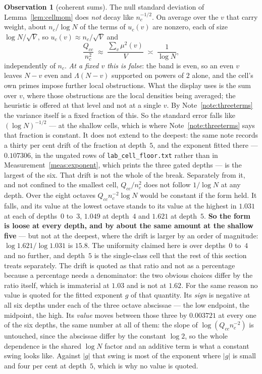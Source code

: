 \documentclass[11pt,a4paper]{article}
\theoremstyle{plain}
\theoremstyle{definition}
\newtheorem{observation}[theorem]{Observation}
\theoremstyle{remark}
\begin{document}
\begin{observation}[coherent sums]\label{obs:coh}
The null standard deviation of Lemma~\ref{lem:cellmom} does \emph{not} decay like
$n_c^{-1/2}$. On average over the $v$ that carry weight, about
$n_c/\log N$ of the terms of $u_c(v)$ are nonzero, each of size
$\log N/\sqrt V$, so $u_c(v)\approx n_c/\sqrt V$ and
\[
  \frac{Q_{cc}}{n_c^2}
  \;\approx\;\frac{\sum_v\mu^2(v)}{V}
  \;\asymp\;\frac{1}{\log N},
\]
independently of $n_c$. \emph{At a fixed $v$ this is false}: the band
is even, so an even $v$ leaves $N-v$ even and $\Lambda(N-v)$ supported
on powers of $2$ alone, and the cell's own primes impose further local
obstructions. What the display uses is the sum over $v$, where those
obstructions are the local densities being averaged; the heuristic is
offered at that level and not at a single $v$. By
Note~\ref{note:threeterms} the variance
itself is a fixed fraction of this. So the standard error falls
like $(\log N)^{-1/2}$ --- at the shallow cells, which is where
Note~\ref{note:threeterms} says that fraction is constant. It
does not extend to the deepest: the same note records a thirty per
cent drift of the fraction at depth~$5$, and the exponent fitted there
--- $0.107306$, in the ungated rows of \texttt{lab\_cell\_floor.txt}
rather than in Measurement~\ref{meas:exponent}, which prints the three
gated depths --- is the largest of the six. That drift is not the
whole of the break. Separately from it, and not confined to the
smallest cell, $Q_{cc}/n_c^2$ does not follow $1\!/\!\log N$ at any
depth. Over the eight octaves
$Q_{cc}n_c^{-2}\log N$ would be constant if the form held. It falls,
and its value at the lowest octave stands to its value at the highest
in $1.031$ at each of depths~$0$ to~$3$, $1.049$ at depth~$4$ and
$1.621$ at depth~$5$. \textbf{So the form is loose at every depth, and
by about the same amount at the shallow five} --- but not at the
deepest, where the drift is larger by an order of magnitude:
$\log 1.621/\log 1.031$ is $15.8$. The uniformity claimed here is over
depths~$0$ to~$4$ and no further, and depth~$5$ is the single-class
cell that the rest of this section treats separately. The drift is quoted as that ratio and not as a
percentage because a percentage needs a denominator: the two obvious
choices differ by the ratio itself, which is immaterial at $1.03$ and
is not at $1.62$. For the same reason no value is quoted for the
fitted exponent $g$ of that quantity. Its
\emph{sign} is negative at all six depths under
each of the three octave abscissae --- the low endpoint, the midpoint,
the high. Its \emph{value} moves between those three by $0.003721$ at
every one of the six depths, the same number at all of them: the
slope of $\log(Q_{cc}n_c^{-2})$ is untouched, since the abscissae
differ by the constant $\log 2$, so the whole dependence is the shared
$\log N$ factor and an additive term is what a constant swing looks
like. Against $|g|$ that swing is most of the exponent where $|g|$ is
small and four per cent at depth~$5$, which is why no value is
quoted.


\end{observation}
\end{document}
